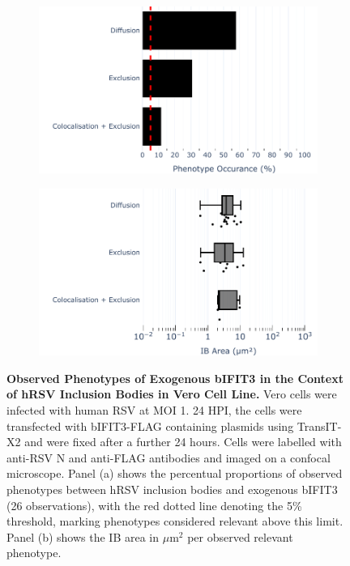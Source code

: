 \begin{figure}
    \begin{subfigure}{0.495\textwidth}
        \caption{}
        \includegraphics[width=1\linewidth]{09. Chapter 4/Figs/02. Overexpression/03. IFIT3/01. bar_i3_hrsv.pdf} 
    \end{subfigure}
    \begin{subfigure}{0.495\textwidth}
        \caption{}
        \includegraphics[width=1\linewidth]{09. Chapter 4/Figs/02. Overexpression/03. IFIT3/02. box_i3_hrsv.pdf}
    \end{subfigure}
    \caption[Observed Phenotypes of Exogenous bIFIT3 in the Context of hRSV Inclusion Bodies in Vero Cell Line.]{\textbf{Observed Phenotypes of Exogenous bIFIT3 in the Context of hRSV Inclusion Bodies in Vero Cell Line.} Vero cells were infected with human RSV at MOI 1. 24 HPI, the cells were transfected with bIFIT3-FLAG containing plasmids using TransIT-X2 and were fixed after a further 24 hours. Cells were labelled with anti-RSV N and anti-FLAG antibodies and imaged on a confocal microscope. Panel (a) shows the percentual proportions of observed phenotypes between hRSV inclusion bodies and exogenous bIFIT3 (26 observations), with the red dotted line denoting the 5\% threshold, marking phenotypes considered relevant above this limit. Panel (b) shows the IB area in \(\mu \mbox{m}^2\) per observed relevant phenotype.}
    \label{fig:Observed Phenotypes of Exogenous bIFIT3 in the Context of hRSV Inclusion Bodies in VERO Cell Line}
\end{figure}

